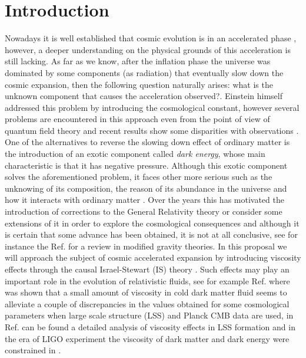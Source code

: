 \documentclass[twocolumn,showpacs,nofootinbib,floats,amsmath,amssymb]{revtex4}
\begin{document}
\maketitle

\section{Introduction}\label{intro}
Nowadays it is well established that cosmic evolution is in an accelerated phase \cite{riess, perlmutter, wmap}, however, a deeper understanding on the physical grounds of this acceleration is still lacking. As far as we know, after the inflation phase the universe was dominated by some components (as radiation) that eventually slow down the cosmic expansion, then the following question naturally arises: what is the unknown component that causes the acceleration observed?. Einstein himself addressed this problem by introducing the cosmological constant, however several problems are encountered in this approach even from the point of view of quantum field theory and recent results show some disparities with observations \cite{padilla, trodden}. One of the alternatives to reverse the slowing down effect of ordinary matter is the introduction of an exotic component called {\it dark energy}, whose main characteristic is that it has negative pressure. Although this exotic component solves the aforementioned problem, it faces other more serious such as the unknowing of its composition, the reason of its abundance in the universe and how it interacts with ordinary matter \cite{wang}. Over the years this has motivated the introduction of corrections to the General Relativity theory or consider some extensions of it in order to explore the cosmological consequences and although it is certain that some advance has been obtained, it is not at all conclusive, see for instance the Ref. \cite{clifton} for a review in modified gravity theories. In this proposal we will approach the subject of cosmic accelerated expansion by introducing viscosity effects through the causal Israel-Stewart (IS) theory \cite{Israel1976, Israel1979, viscous, maartens}. Such effects may play an important role in the evolution of relativistic fluids, see for example Ref. \cite{ref1} where was shown that a small amount of viscosity in cold dark matter fluid seems to alleviate a couple of discrepancies in the values obtained for some cosmological parameters when large scale structure (LSS) and Planck CMB data are used, in Ref. \cite{ref2} can be found a detailed analysis of viscosity effects in LSS formation and in the era of LIGO experiment the viscosity of dark matter and dark energy were constrained in \cite{ref3}.\\
 
\end{document}
